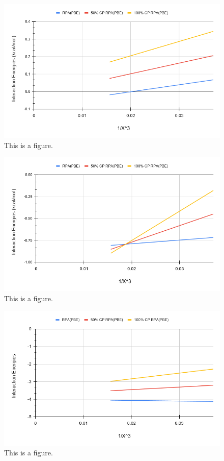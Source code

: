 \documentclass[11pt]{article}
\begin{document}
\begin{figure}[hbpt]
  \includegraphics[scale=0.5]{tpss_1.png}
  \caption{This is a figure.}
  \label{fig:<name>}
\end{figure}

\begin{figure}
  \includegraphics[scale=0.5]{tpss_8.png}
  \caption{This is a figure.}
  \label{fig:<name>}
\end{figure}

\begin{figure}
  \includegraphics[scale=0.5]{tpss_11.png}
  \caption{This is a figure.}
  \label{fig:<name>}
\end{figure}
\end{document}
